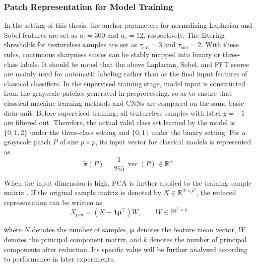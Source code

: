 \subsubsection{Patch Representation for Model Training}
\par In the setting of this thesis, the anchor parameters for normalizing
Laplacian and Sobel features are set as $a_l=300$ and $a_s=12$, respectively.
The filtering thresholds for textureless samples are set as
$\tau_{\mathrm{std}}=3$ and $\tau_{\mathrm{sob}}=2$. With these rules,
continuous sharpness scores can be stably mapped into binary or three-class
labels. It should be noted that the above Laplacian, Sobel, and FFT scores are
mainly used for automatic labeling rather than as the final input features of
classical classifiers. In the supervised training stage, model input is
constructed from the grayscale patches generated in preprocessing, so as to
ensure that classical machine learning methods and CNNs are compared on the
same basic data unit. Before supervised training, all textureless samples with
label $y=-1$ are filtered out. Therefore, the actual valid class set learned
by the model is $\{0,1,2\}$ under the three-class setting and $\{0,1\}$ under
the binary setting. For a grayscale patch $P$ of size $p\times p$, its input
vector for classical models is represented as
\begin{equation}
    \tilde{\mathbf{z}}(P)=\frac{1}{255}\,\operatorname{vec}(P)\in\mathbb{R}^{p^2}
    \label{eq:ml-input-vector}
\end{equation}
\par When the input dimension is high, PCA is further applied to the training
sample matrix \cite{perry2025inference,zheng2021application}. If the original
sample matrix is denoted by $X\in\mathbb{R}^{N\times p^2}$, the reduced
representation can be written as
\begin{equation}
    X_{\mathrm{pca}}=(X-\mathbf{1}\boldsymbol{\mu}^\top)W,\qquad
    W\in\mathbb{R}^{p^2\times k}
    \label{eq:ml-pca}
\end{equation}
\par where $N$ denotes the number of samples, $\boldsymbol{\mu}$ denotes the
feature mean vector, $W$ denotes the principal component matrix, and $k$
denotes the number of principal components after reduction. Its specific value
will be further analyzed according to performance in later experiments.

